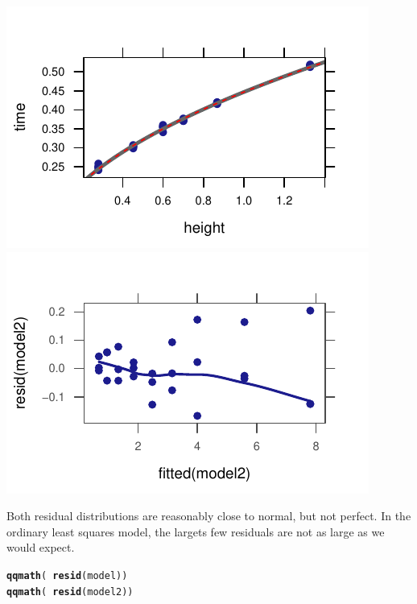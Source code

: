 \documentclass[twoside]{book}\usepackage[]{graphicx}\usepackage[]{xcolor}
\makeatletter
\def\maxwidth{ %
  \ifdim\Gin@nat@width>\linewidth
    \linewidth
  \else
    \Gin@nat@width
  \fi
}
\newcommand{\hlopt}[1]{\textcolor[rgb]{0,0,0}{#1}}%
\newcommand{\hlstd}[1]{\textcolor[rgb]{0.345,0.345,0.345}{#1}}%
\newcommand{\hlkwd}[1]{\textcolor[rgb]{0.737,0.353,0.396}{\textbf{#1}}}%
\newenvironment{kframe}{%
 \def\at@end@of@kframe{}%
 \ifinner\ifhmode%
  \def\at@end@of@kframe{\end{minipage}}%
  \begin{minipage}{\columnwidth}%
 \fi\fi%
 \def\FrameCommand##1{\hskip\@totalleftmargin \hskip-\fboxsep
 \colorbox{shadecolor}{##1}\hskip-\fboxsep
     \hskip-\linewidth \hskip-\@totalleftmargin \hskip\columnwidth}%
 \MakeFramed {\advance\hsize-\width
   \@totalleftmargin\z@ \linewidth\hsize
   \@setminipage}}%
 {\par\unskip\endMakeFramed%
 \at@end@of@kframe}
\newenvironment{knitrout}{}{} %
\makeatother
\begin{document}
\begin{solution}
\begin{knitrout}
{\centering \includegraphics[width=\maxwidth]{figures/fig-unnamed-chunk-229-1} 
\includegraphics[width=\maxwidth]{figures/fig-unnamed-chunk-229-2} 

}



\end{knitrout}
	Both residual distributions are reasonably close to normal, but not perfect.
	In the ordinary least squares model, the largets few residuals are not as large
	as we would expect.
\begin{knitrout}
\color{fgcolor}\begin{kframe}
\begin{alltt}
\hlkwd{qqmath}\hlstd{(}\hlopt{~}\hlkwd{resid}\hlstd{(model))}
\hlkwd{qqmath}\hlstd{(}\hlopt{~}\hlkwd{resid}\hlstd{(model2))}
\end{alltt}
\end{kframe}


\end{knitrout}
\end{solution}
\end{document}
